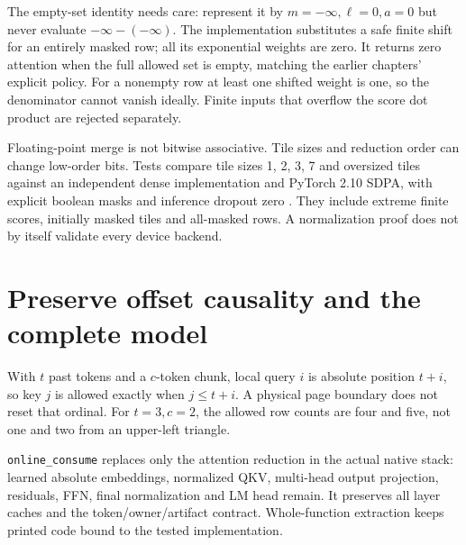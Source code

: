 
The empty-set identity needs care: represent it by $m=-\infty,\ell=0,a=0$
but never evaluate $-\infty-(-\infty)$. The implementation substitutes a
safe finite shift for an entirely masked row; all its exponential weights
are zero. It returns zero attention when the full allowed set is empty,
matching the earlier chapters' explicit policy. For a nonempty row at least
one shifted weight is one, so the denominator cannot vanish ideally.
Finite inputs that overflow the score dot product are rejected separately.


Floating-point merge is not bitwise associative. Tile sizes and reduction
order can change low-order bits. Tests compare tile sizes 1, 2, 3, 7 and
oversized tiles against an independent dense implementation and PyTorch
2.10 SDPA, with explicit boolean masks and inference dropout zero
\cite{evod38:sdpa}. They include extreme finite scores, initially masked
tiles and all-masked rows. A normalization proof does not by itself validate
every device backend.

\section{Preserve offset causality and the complete model}
\label{evod38:native}
With $t$ past tokens and a $c$-token chunk, local query $i$ is absolute
position $t+i$, so key $j$ is allowed exactly when $j\le t+i$. A physical
page boundary does not reset that ordinal. For $t=3,c=2$, the allowed row
counts are four and five, not one and two from an upper-left triangle.


\texttt{online\_consume} replaces only the attention reduction in the
actual native stack: learned absolute embeddings, normalized QKV,
multi-head output projection, residuals, FFN, final normalization and LM
head remain. It preserves all layer caches and the token/owner/artifact
contract. Whole-function extraction keeps printed code bound to the tested
implementation.

\begin{center}\end{center}

